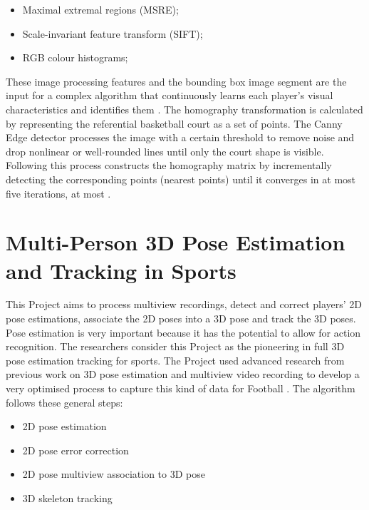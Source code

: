 \documentclass[
11pt,
twoside
]{report}
\begin{document}
\begin{itemize}
\item Maximal extremal regions (MSRE);
\item Scale-invariant feature transform (SIFT);
\item RGB colour histograms;
\end{itemize}


These image processing features and the bounding box image segment are the input for a complex algorithm that continuously learns each player's visual characteristics and identifies them \cite{learn_track_id}.
The homography transformation is calculated by representing the referential basketball court as a set of points. The Canny Edge detector processes the image with a certain threshold to remove noise and drop nonlinear or well-rounded lines until only the court shape is visible. Following this process constructs the homography matrix by incrementally detecting the corresponding points (nearest points) until it converges in at most five iterations, at most \cite{learn_track_id}.

\section{Multi-Person 3D Pose Estimation and Tracking in Sports}






This Project aims to process multiview recordings, detect and correct players' 2D pose estimations, associate the 2D poses into a 3D pose and track the 3D poses. Pose estimation is very important because it has the potential to allow for action recognition. The researchers consider this Project as the pioneering in full 3D pose estimation tracking for sports. The Project used advanced research from previous work on 3D pose estimation and multiview video recording to develop a very optimised process to capture this kind of data for Football \cite{cvpr_2019}. The algorithm follows these general steps:

\begin{itemize}
\item 2D pose estimation
\item 2D pose error correction
\item 2D pose multiview association to 3D pose
\item 3D skeleton tracking
\end{itemize}
\end{document}
